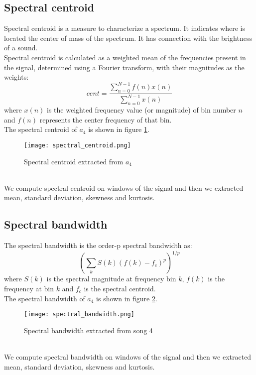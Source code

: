 \subsection{Spectral centroid}
Spectral centroid is a measure to characterize a spectrum. It indicates where is located the center of mass of the spectrum. It has connection with the brightness of a sound.
\\
Spectral centroid is calculated as a weighted mean of the frequencies present in the signal, determined using a Fourier transform, with their magnitudes as the weights:
\begin{equation}
	cent=\dfrac{\sum_{n=0}^{N-1}{f(n)x(n)}}{\sum_{n=0}^{N-1}{x(n)}}
\end{equation}
where $x(n)$ is the weighted frequency value (or magnitude) of bin number $n$ and $f(n)$ represents the center frequency of that bin.
\\
The spectral centroid of $a_4$ is shown in figure \ref{fig:spectral_centroid}.
\begin{figure}[h]
    \centering
    \texttt{[image: spectral\_centroid.png]} 
	\caption{Spectral centroid extracted from $a_4$}
    \label{fig:spectral_centroid}
\end{figure}
\\
We compute spectral centroid on windows of the signal and then we extracted mean, standard deviation, skewness and kurtosis.

\subsection{Spectral bandwidth}
The spectral bandwidth is the order-p spectral bandwidth as:
\begin{equation}
	{\left(\sum_{k}{S(k){(f(k)-f_c)}^p}\right)}^{1/p}
\end{equation}
where $S(k)$ is the spectral magnitude at frequency bin $k$, $f(k)$ is the frequency at bin $k$ and $f_c$ is the spectral centroid.
\\
The spectral bandwidth of $a_4$ is shown in figure \ref{fig:spectral_bandwidth}.
\begin{figure}[h]
    \centering
    \texttt{[image: spectral\_bandwidth.png]} 
	\caption{Spectral bandwidth extracted from song 4}
    \label{fig:spectral_bandwidth}
\end{figure}
\\
We compute spectral bandwidth on windows of the signal and then we extracted mean, standard deviation, skewness and kurtosis.

